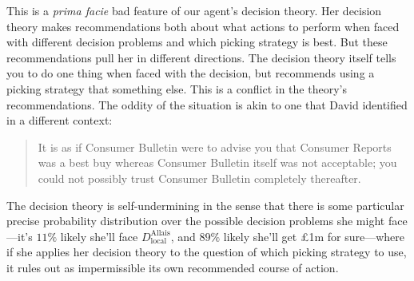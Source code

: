 \documentclass[a4paper,final]{article}
\newenvironment{CCM rewritten}
{\begingroup\color{blue}} %
{\endgroup}              %
\begin{document}
This is a \emph{prima facie} bad feature of our agent's decision theory. Her decision theory makes recommendations both about what actions to perform when faced with different decision problems and which picking strategy is best. But these recommendations pull her in different directions. The decision theory itself tells you to do one thing when faced with the decision, but recommends using a picking strategy that something else. 
This is a conflict in the theory's recommendations. The oddity of the situation is akin to one that David \citet[56]{lewis1971iim} identified in a different context:
\begin{quote}
	It is as if Consumer Bulletin were to advise you that Consumer Reports was a best
	buy whereas Consumer Bulletin itself was not acceptable; you could not possibly
	trust Consumer Bulletin completely thereafter.
\end{quote}

The decision theory is self-undermining in the sense that there is some particular precise probability distribution over the possible decision problems she might face---it's $11\%$ likely she'll face $D^{\mathrm{Allais}}_{\mathrm{local}}$, and $89\%$ likely she'll get \pounds 1m for sure---where if she applies her decision theory to the question of which picking strategy to use, it rules out as impermissible its own recommended course of action. 
\end{document}
